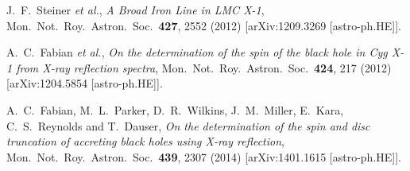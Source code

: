 \documentclass[11pt,a4paper,pdftex]{article}
\begin{document}
\begin{thebibliography}{99}
  J.~F.~Steiner {\it et al.},
  {\it A Broad Iron Line in LMC X-1},
  Mon.\ Not.\ Roy.\ Astron.\ Soc.\  {\bf 427}, 2552 (2012)
  [arXiv:1209.3269 [astro-ph.HE]].  
  
  A.~C.~Fabian {\it et al.},
  {\it On the determination of the spin of the black hole in Cyg X-1 from X-ray reflection spectra},
  Mon.\ Not.\ Roy.\ Astron.\ Soc.\  {\bf 424}, 217 (2012)
  [arXiv:1204.5854 [astro-ph.HE]].
  
  A.~C.~Fabian, M.~L.~Parker, D.~R.~Wilkins, J.~M.~Miller, E.~Kara, C.~S.~Reynolds and T.~Dauser,
  {\it On the determination of the spin and disc truncation of accreting black holes using X-ray reflection},
  Mon.\ Not.\ Roy.\ Astron.\ Soc.\  {\bf 439}, 2307 (2014)
  [arXiv:1401.1615 [astro-ph.HE]].     
  
\end{thebibliography}
\end{document}
